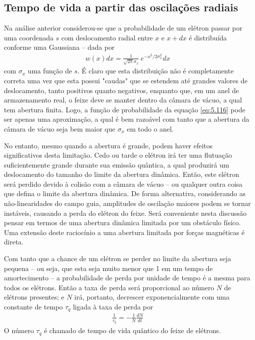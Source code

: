 \subsection{Tempo de vida a partir das oscilações radiais}\label{sec:5.7}
Na análise anterior considerou-se que a probabilidade de um elétron passar por uma coordenada $s$ com deslocamento radial entre $x$ e $x+dx$ é distribuída conforme uma Gaussiana -- dada por
\begin{align}
	w(x)dx = \frac{1}{\sqrt{2\pi} \sigma_x}\ e^{-x^2/2\sigma_x^2}dx\label{eq:5.116}
\end{align}
com $\sigma_x$ uma função de $s$. É claro que esta distribuição não é completamente correta uma vez que esta possui "caudas" que se estendem até grandes valores de deslocamento, tanto positivos quanto negativos, enquanto que, em um anel de armazenamento real, o feixe deve se manter dentro da câmara de vácuo, a qual tem abertura finita. Logo, a função de probabilidade da equação \eqref{eq:5.116} pode ser apenas uma aproximação, a qual é bem razoável com tanto que a abertura da câmara de vácuo seja bem maior que $\sigma_x$ em todo o anel.

No entanto, mesmo quando a abertura é grande, podem haver efeitos significativos desta limitação. Cedo ou tarde o elétron irá ter uma flutuação suficientemente grande durante sua emissão quântica, a qual produzirá um deslocamento do tamanho do limite da abertura dinâmica. Então, este elétron será perdido devido à colisão com a câmara de vácuo -- ou qualquer outra coisa que defina o limite da abertura dinâmica. De forma alternativa, considerando as não-linearidades do campo guia, amplitudes de oscilação maiores podem se tornar instáveis, causando a perda do elétron do feixe. Será conveniente nesta discussão pensar em termos de uma abertura dinâmica limitada por um obstáculo físico. Uma extensão deste raciocínio a uma abertura limitada por forças magnéticas é direta.

Com tanto que a chance de um elétron se perder no limite da abertura seja pequena -- ou seja, que esta seja muito menor que 1 em um tempo de amortecimento -- a probabilidade de perda por unidade de tempo é a mesma para todos os elétrons. Então a taxa de perda será proporcional ao número $N$ de elétrons presentes; e $N$ irá, portanto, decrescer exponencialmente com uma constante de tempo $\tau_q$ ligada à taxa de perda por
\begin{align}
	\frac{1}{\tau_q} = -\frac{1}{N} \frac{dN}{dt}
\end{align}
O número $\tau_q$ é chamado de tempo de vida quântico do feixe de elétrons.

